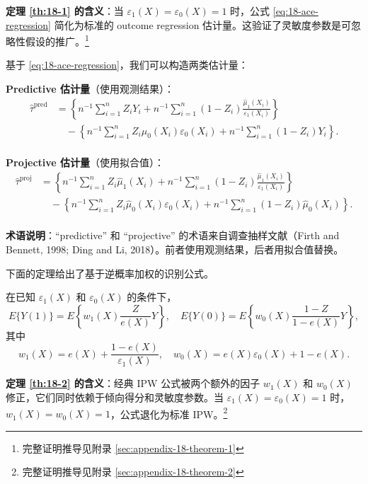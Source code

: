 \textbf{定理 \ref{th:18-1} 的含义}：当 $\varepsilon_1(X) = \varepsilon_0(X) = 1$ 时，公式 \cref{eq:18-ace-regression} 简化为标准的 outcome regression 估计量。这验证了灵敏度参数是可忽略性假设的推广。\footnote{完整证明推导见附录 \cref{sec:appendix-18-theorem-1}}

基于 \cref{eq:18-ace-regression}，我们可以构造两类估计量：

\textbf{Predictive 估计量}（使用观测结果）：
\begin{align}
\hat{\tau}^{\mathrm{pred}} &= \left\{n^{-1}\sum_{i=1}^n Z_i Y_i + n^{-1}\sum_{i=1}^n (1-Z_i)\frac{\hat{\mu}_1(X_i)}{\varepsilon_1(X_i)}\right\} \label{eq:18-tau-pred} \\
&\quad - \left\{n^{-1}\sum_{i=1}^n Z_i\hat{\mu}_0(X_i)\varepsilon_0(X_i) + n^{-1}\sum_{i=1}^n (1-Z_i)Y_i\right\} . \\
\end{align}

\textbf{Projective 估计量}（使用拟合值）：
\begin{align}
\hat{\tau}^{\mathrm{proj}} &= \left\{n^{-1}\sum_{i=1}^n Z_i\hat{\mu}_1(X_i) + n^{-1}\sum_{i=1}^n (1-Z_i)\frac{\hat{\mu}_1(X_i)}{\varepsilon_1(X_i)}\right\} \label{eq:18-tau-proj} \\
&\quad - \left\{n^{-1}\sum_{i=1}^n Z_i\hat{\mu}_0(X_i)\varepsilon_0(X_i) + n^{-1}\sum_{i=1}^n (1-Z_i)\hat{\mu}_0(X_i)\right\} . \\
\end{align}

\textbf{术语说明}：``predictive'' 和 ``projective'' 的术语来自调查抽样文献（Firth and Bennett, 1998; Ding and Li, 2018）。前者使用观测结果，后者用拟合值替换。

下面的定理给出了基于逆概率加权的识别公式。

\begin{Theorem}\label{th:18-2}
在已知 $\varepsilon_1(X)$ 和 $\varepsilon_0(X)$ 的条件下，
\[
E\{Y(1)\} = E\left\{w_1(X)\frac{Z}{e(X)}Y\right\} , \quad
E\{Y(0)\} = E\left\{w_0(X)\frac{1-Z}{1-e(X)}Y\right\} ,
\]
其中
\begin{equation}
w_1(X) = e(X) + \frac{1-e(X)}{\varepsilon_1(X)} , \quad
w_0(X) = e(X)\varepsilon_0(X) + 1 - e(X) .
\label{eq:18-ipw-weights}
\end{equation}
\end{Theorem}

\textbf{定理 \ref{th:18-2} 的含义}：经典 IPW 公式被两个额外的因子 $w_1(X)$ 和 $w_0(X)$ 修正，它们同时依赖于倾向得分和灵敏度参数。当 $\varepsilon_1(X) = \varepsilon_0(X) = 1$ 时，$w_1(X) = w_0(X) = 1$，公式退化为标准 IPW。\footnote{完整证明推导见附录 \cref{sec:appendix-18-theorem-2}}

